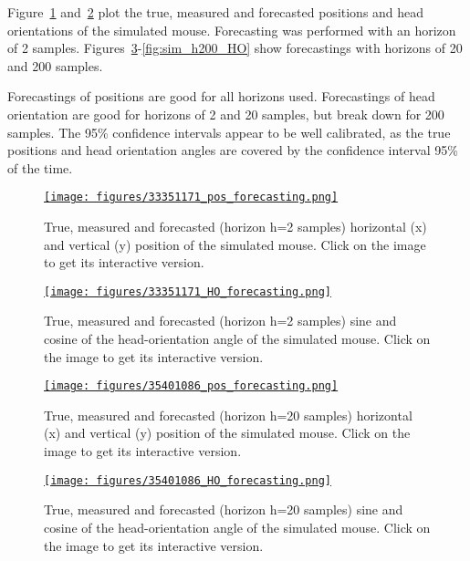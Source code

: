 \documentclass[12pt]{article}
\begin{document}
Figure~\ref{fig:sim_h2_pos} and~\ref{fig:sim_h2_HO} plot the true, measured and forecasted positions
and head orientations of the simulated mouse. Forecasting was performed with an horizon of 2 samples.
%
Figures~\ref{fig:sim_h20_pos}-\ref{fig:sim_h200_HO} show forecastings with horizons of 20 and 200 samples.

Forecastings of positions are good for all horizons used. Forecastings of head
orientation are good for horizons of 2 and 20 samples, but break down for 200
samples.
%
The 95\% confidence intervals appear to be well calibrated, as the true
positions and head orientation angles are covered by the confidence interval
95\% of the time.

\begin{figure}
    \centering
    \href{https://www.gatsby.ucl.ac.uk/~rapela/aman/reports/ekfForKinematicsAndHeadOrientation/figures/33351171_pos_forecasting.html}{\texttt{[image: figures/33351171\_pos\_forecasting.png]}}
    \caption{True, measured and forecasted (horizon h=2 samples) horizontal (x) and vertical (y)
    position of the simulated mouse. Click on the image to get its
    interactive version.}
    \label{fig:sim_h2_pos}
\end{figure}

\begin{figure}
    \centering
    \href{https://www.gatsby.ucl.ac.uk/~rapela/aman/reports/ekfForKinematicsAndHeadOrientation/figures/33351171_HO_forecasting.html}{\texttt{[image: figures/33351171\_HO\_forecasting.png]}}
    \caption{True, measured and forecasted (horizon h=2 samples) sine and
    cosine of the head-orientation angle
    of the simulated mouse. Click on the image to get its
    interactive version.}
    \label{fig:sim_h2_HO}
\end{figure}

\begin{figure}
    \centering
    \href{https://www.gatsby.ucl.ac.uk/~rapela/aman/reports/ekfForKinematicsAndHeadOrientation/figures/35401086_pos_forecasting.html}{\texttt{[image: figures/35401086\_pos\_forecasting.png]}}
    \caption{True, measured and forecasted (horizon h=20 samples) horizontal (x) and vertical (y)
    position of the simulated mouse. Click on the image to get its
    interactive version.}
    \label{fig:sim_h20_pos}
\end{figure}

\begin{figure}
    \centering
    \href{https://www.gatsby.ucl.ac.uk/~rapela/aman/reports/ekfForKinematicsAndHeadOrientation/figures/35401086_HO_forecasting.html}{\texttt{[image: figures/35401086\_HO\_forecasting.png]}}
    \caption{True, measured and forecasted (horizon h=20 samples) sine and
    cosine of the head-orientation angle
    of the simulated mouse. Click on the image to get its
    interactive version.}
    \label{fig:sim_h20_HO}
\end{figure}
\end{document}
